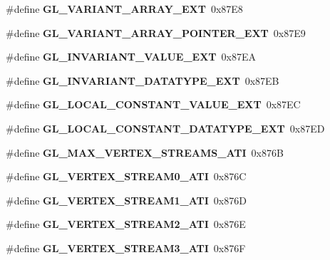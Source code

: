 \begin{DoxyCompactItemize}
\item 
\#define {\bfseries G\+L\+\_\+\+V\+A\+R\+I\+A\+N\+T\+\_\+\+A\+R\+R\+A\+Y\+\_\+\+E\+X\+T}~0x87\+E8\label{_s_d_l__opengl_8h_ad1c0f6a92f4c53510f3ab80ea091742c}

\item 
\#define {\bfseries G\+L\+\_\+\+V\+A\+R\+I\+A\+N\+T\+\_\+\+A\+R\+R\+A\+Y\+\_\+\+P\+O\+I\+N\+T\+E\+R\+\_\+\+E\+X\+T}~0x87\+E9\label{_s_d_l__opengl_8h_ad2dfa96531015f1908bc7e7c92c0667d}

\item 
\#define {\bfseries G\+L\+\_\+\+I\+N\+V\+A\+R\+I\+A\+N\+T\+\_\+\+V\+A\+L\+U\+E\+\_\+\+E\+X\+T}~0x87\+E\+A\label{_s_d_l__opengl_8h_adb0a6490632b7c971c2fa0b9e61b2274}

\item 
\#define {\bfseries G\+L\+\_\+\+I\+N\+V\+A\+R\+I\+A\+N\+T\+\_\+\+D\+A\+T\+A\+T\+Y\+P\+E\+\_\+\+E\+X\+T}~0x87\+E\+B\label{_s_d_l__opengl_8h_a8938367b0d8dbd1a28e7c25069fdf836}

\item 
\#define {\bfseries G\+L\+\_\+\+L\+O\+C\+A\+L\+\_\+\+C\+O\+N\+S\+T\+A\+N\+T\+\_\+\+V\+A\+L\+U\+E\+\_\+\+E\+X\+T}~0x87\+E\+C\label{_s_d_l__opengl_8h_ae4401b9f6cc1a271ca434820fb82d22f}

\item 
\#define {\bfseries G\+L\+\_\+\+L\+O\+C\+A\+L\+\_\+\+C\+O\+N\+S\+T\+A\+N\+T\+\_\+\+D\+A\+T\+A\+T\+Y\+P\+E\+\_\+\+E\+X\+T}~0x87\+E\+D\label{_s_d_l__opengl_8h_afed08673d93faa2c2a2b118a99662d20}

\item 
\#define {\bfseries G\+L\+\_\+\+M\+A\+X\+\_\+\+V\+E\+R\+T\+E\+X\+\_\+\+S\+T\+R\+E\+A\+M\+S\+\_\+\+A\+T\+I}~0x876\+B\label{_s_d_l__opengl_8h_a82b5be21bf0a47696df7994fe1528ac2}

\item 
\#define {\bfseries G\+L\+\_\+\+V\+E\+R\+T\+E\+X\+\_\+\+S\+T\+R\+E\+A\+M0\+\_\+\+A\+T\+I}~0x876\+C\label{_s_d_l__opengl_8h_af77afccb3c1a29231f87c8296a22700d}

\item 
\#define {\bfseries G\+L\+\_\+\+V\+E\+R\+T\+E\+X\+\_\+\+S\+T\+R\+E\+A\+M1\+\_\+\+A\+T\+I}~0x876\+D\label{_s_d_l__opengl_8h_a27e51ceedbc3d9653ce9d325be157e47}

\item 
\#define {\bfseries G\+L\+\_\+\+V\+E\+R\+T\+E\+X\+\_\+\+S\+T\+R\+E\+A\+M2\+\_\+\+A\+T\+I}~0x876\+E\label{_s_d_l__opengl_8h_a11e7dab41fbe121699d05f6fc76e11dc}

\item 
\#define {\bfseries G\+L\+\_\+\+V\+E\+R\+T\+E\+X\+\_\+\+S\+T\+R\+E\+A\+M3\+\_\+\+A\+T\+I}~0x876\+F\label{_s_d_l__opengl_8h_a1aa1d137bbfc3b43fa9162662966e037}


\end{DoxyCompactItemize}
